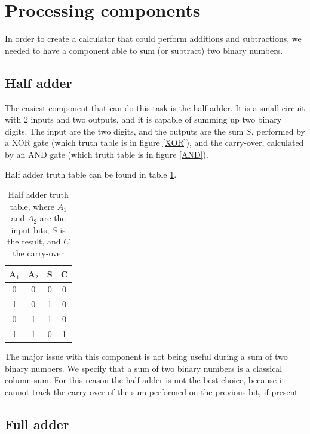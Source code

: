 \documentclass{article}
\begin{document}
\clearpage








\section{Processing components}

In order to create a calculator that could perform additions and subtractions, we needed to have a component able to sum (or subtract) two binary numbers.

\subsection{Half adder}

The easiest component that can do this task is the half adder. It is a small circuit with 2 inputs and two outputs, and it is capable of summing up two binary digits. The input are the two digits, and the outputs are the sum $S$, performed by a XOR gate (which truth table is in figure \ref{XOR}), and the carry-over, calculated by an AND gate (which truth table is in figure \ref{AND}).

\vspace{3mm}

Half adder truth table can be found in table \ref{HalfAdderTT}.

\begin{table}[h]
  \centering
  \begin{tabular}{| c | c || c | c |}
  \hline
  A$_1$ & A$_2$ & S & C \\ \hline
  0 & 0 & 0 & 0 \\ \hline
  1 & 0 & 1 & 0 \\ \hline
  0 & 1 & 1 & 0 \\ \hline
  1 & 1 & 0 & 1 \\ \hline
  \end{tabular}
  \caption{Half adder truth table, where $A_1$ and $A_2$ are the input bits, $S$ is the result, and $C$ the carry-over}
  \label{HalfAdderTT}
\end{table}

The major issue with this component is not being useful during a sum of two binary numbers. We specify that a sum of two binary numbers is a classical column sum. For this reason the half adder is not the best choice, because it cannot track the carry-over of the sum performed on the previous bit, if present.

\subsection{Full adder}
\end{document}
